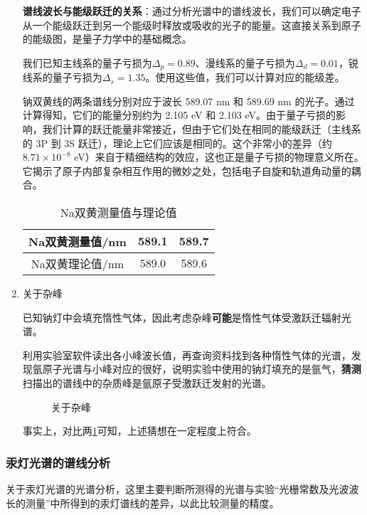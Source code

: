 \documentclass[dvipsnames, svgnames,a4paper,11pt]{article}
\begin{document}
\begin{enumerate}
		\textbf{谱线波长与能级跃迁的关系}：通过分析光谱中的谱线波长，我们可以确定电子从一个能级跃迁到另一个能级时释放或吸收的光子的能量。这直接关系到原子的能级图，是量子力学中的基础概念。
		
		我们已知主线系的量子亏损为\( \Delta_p = 0.89 \)、漫线系的量子亏损为\( \Delta_d = 0.01 \)，锐线系的量子亏损为\( \Delta_s = 1.35 \)。使用这些值，我们可以计算对应的能级差。
		
		钠双黄线的两条谱线分别对应于波长 589.07 nm 和 589.69 nm 的光子。通过计算得知，它们的能量分别约为 2.105 eV 和 2.103 eV。由于量子亏损的影响，我们计算的跃迁能量非常接近，但由于它们处在相同的能级跃迁（主线系的 3P 到 3S 跃迁），理论上它们应该是相同的。这个非常小的差异（约 \(8.71 \times 10^{-8}\) eV）来自于精细结构的效应，这也正是量子亏损的物理意义所在。它揭示了原子内部复杂相互作用的微妙之处，包括电子自旋和轨道角动量的耦合。
		
		\begin{table}[ht]
			\centering
			\begin{tabular}{|c|c|c|}
				\hline
				Na双黄测量值/nm & 589.1 & 589.7 \\
				\hline
				Na双黄理论值/nm & 589.0 & 589.6 \\
				\hline
			\end{tabular}
			\caption{Na双黄测量值与理论值}
			\label{tab:tab1}
		\end{table}		
		
		\item 关于杂峰
		
		已知钠灯中会填充惰性气体，因此考虑杂峰\textbf{可能}是惰性气体受激跃迁辐射光谱。
		
		利用实验室软件读出各小峰波长值，再查询资料找到各种惰性气体的光谱，发现氩原子光谱与小峰对应的很好，说明实验中使用的钠灯填充的是氩气，\textbf{猜测}扫描出的谱线中的杂质峰是氩原子受激跃迁发射的光谱。
		
		\begin{figure}[htbp]
			\centering
			\caption{关于杂峰}
			\label{fig:fig9}			
		\end{figure}
		
		事实上，对比两\cref{fig:fig9}可知，上述猜想在一定程度上符合。
		
	\end{enumerate}
	
	\subsubsection{汞灯光谱的谱线分析}
	关于汞灯光谱的光谱分析，这里主要判断所测得的光谱与实验“光栅常数及光波波长的测量”中所得到的汞灯谱线的差异，以此比较测量的精度。
	
\end{document}
